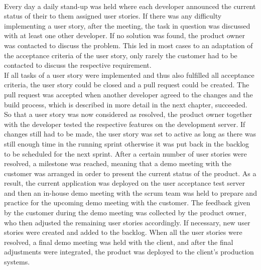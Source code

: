 \documentclass[Bachelor,BIF,english]{twbook}
\begin{document}
\\[\baselineskip]
Every day a daily stand-up was held where each developer announced the current status of their to them assigned user stories. If there was any difficulty implementing a user story, after the meeting, the task in question was discussed with at least one other developer. If no solution was found, the product owner was contacted to discuss the problem. This led in most cases to an adaptation of the acceptance criteria of the user story, only rarely the customer had to be contacted to discuss the respective requirement. 
\\[\baselineskip]
If all tasks of a user story were implemented and thus also fulfilled all acceptance criteria, the user story could be closed and a pull request could be created. The pull request was accepted when another developer agreed to the changes and the build process, which is described in more detail in the next chapter, succeeded. So that a user story was now considered as resolved, the product owner together with the developer tested the respective features on the development server. If changes still had to be made, the user story was set to active as long as there was still enough time in the running sprint otherwise it was put back in the backlog to be scheduled for the next sprint. After a certain number of user stories were resolved, a milestone was reached, meaning that a demo meeting with the customer was arranged in order to present the current status of the product. As a result, the current application was deployed on the user acceptance test server and then an in-house demo meeting with the scrum team was held to prepare and practice for the upcoming demo meeting with the customer. The feedback given by the customer during the demo meeting was collected by the product owner, who then adjusted the remaining user stories accordingly. If necessary, new user stories were created and added to the backlog. When all the user stories were resolved, a final demo meeting was held with the client, and after the final adjustments were integrated, the product was deployed to the client's production systems.
\end{document}
